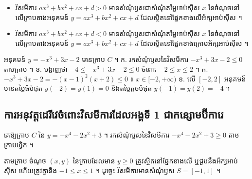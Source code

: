 \begin{formulaBox}[ជាទូទៅ]
\begin{itemize}
  \item វិសមីការ $ax^3 + bx^2 + cx + d > 0$ មានសំណុំឫសជាសំណុំតម្លៃអាប់ស៊ីស $x$ នៃចំណុចនៅលើក្រាបតាងអនុគមន៍ $y = ax^3 + bx^2 + cx + d$ ដែលស្ថិតនៅផ្នែកខាងលើអ័ក្សអាប់ស៊ីស ។
  \item វិសមីការ $ax^3 + bx^2 + cx + d < 0$ មានសំណុំឫសជាសំណុំតម្លៃអាប់ស៊ីស $x$ នៃចំណុចនៅលើក្រាបតាងអនុគមន៍ $y = ax^3 + bx^2 + cx + d$ ដែលស្ថិតនៅផ្នែកខាងក្រោមអ័ក្សអាប់ស៊ីស ។
\end{itemize}
\end{formulaBox}

\begin{pro}
អនុគមន៍ $y = -x^3 + 3x - 2$ មានក្រាប $C$ ។ \quad ក. រកសំណុំឫសនៃវិសមីការ $-x^3 + 3x - 2 \le 0$ តាមក្រាប ។ \quad ខ. បង្ហាញថា $-4 \le -x^3 + 3x - 2 \le 0$ ចំពោះ $-2 \le x \le 2$ ។
\ans
ក. $-x^3 + 3x - 2 = -(x - 1)^2(x + 2) \le 0$ ៖ $x \in [-2, +\infty)$ \quad ខ. លើ $[-2, 2]$ អនុគមន៍មានតម្លៃធំបំផុត $y(-2) = y(1) = 0$ និងតម្លៃតូចបំផុត $y(-1) = y(2) = -4$ ។
\end{pro}

\subsection{ការអនុវត្តដេរីវេចំពោះវិសមីការដែលអង្គទី 1 ជាកន្សោមប៊ីការេ}

\begin{example}[ឧទាហរណ៍]
គេឱ្យក្រាប $C$ នៃ $y = -x^4 - 2x^2 + 3$ ។ រកសំណុំឫសនៃវិសមីការ $-x^4 - 2x^2 + 3 \ge 0$ តាមក្រាបហ្វិក ។
\end{example}
តាមក្រាប ចំណុច $(x, y)$ នៃក្រាបដែលមាន $y \ge 0$ ត្រូវស្ថិតនៅផ្នែកខាងលើ ឬជួបនឹងអ័ក្សអាប់ស៊ីស ហើយត្រូវគ្នានឹង $-1 \le x \le 1$ ។ ដូច្នេះ វិសមីការមានសំណុំឫស $S = [-1, 1]$ ។

\begin{center}
\end{center}

